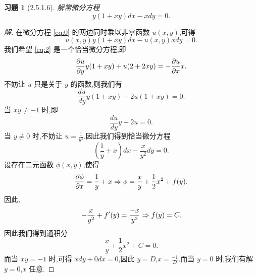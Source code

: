 \documentclass[a4paper, 12pt]{article} %
\newtheorem*{cdtheorem}{习题}
\newenvironment{exercise}
{\bigskip\begin{mdframed}[backgroundcolor=gray!40,rightline=false,leftline=false,topline=false,bottomline=false]\begin{cdtheorem}}
    {\end{cdtheorem}\end{mdframed}\bigskip}
\begin{document}
\begin{exercise}[2.5.1.6]
解常微分方程
\begin{equation}
  \label{eq:0}
  y(1+xy)dx-xdy=0.
\end{equation}
\end{exercise}
\begin{proof}[解]
在微分方程 \eqref{eq:0} 的两边同时乘以非零函数 $u(x,y)$,可得
\begin{equation}
  \label{eq:2}
  u(x,y)y(1+xy)dx-u(x,y)xdy=0.
\end{equation}
我们希望 \eqref{eq:2} 是一个恰当微分方程,即
$$
\frac{\partial u}{\partial y}y(1+xy)+u(2+2xy)=-\frac{\partial u}{\partial x}x.
$$
不妨让 $u$ 只是关于 $y$ 的函数,则我们有
$$
\frac{du}{dy}y(1+xy)+2u(1+xy)=0.
$$
当 $xy\neq -1$ 时,即
$$
\frac{du}{dy}y+2u=0.
$$
当 $y\neq 0$ 时,不妨让 $u=\frac{1}{y^2}$.因此我们得到恰当微分方程
$$
(\frac{1}{y}+x)dx-\frac{x}{y^2}dy=0.
$$
设存在二元函数 $\phi(x,y)$,使得
$$
\frac{\partial\phi}{\partial x}=\frac{1}{y}+x\Rightarrow \phi=\frac{x}{y}+\frac{1}{2}x^2+f(y).
$$
因此,
$$
-\frac{x}{y^2}+f'(y)=\frac{-x}{y^2}\Rightarrow f(y)=C.
$$
因此我们得到通积分
$$
\frac{x}{y}+\frac{1}{2}x^2+C=0.
$$
而当 $xy=-1$ 时,可得 $xdy+0dx=0$,因此 $y=D$,$x=\frac{-1}{D}$.而当
$y=0$ 时,我们有解 $y=0$,$x$ 任意.
\begin{comment}
我们将微分方程分组,得到
$$
(ydx-xdy)+xydx=0.
$$
对于微分方程
\begin{equation}
  \label{eq:1}
  ydx-xdy=0
\end{equation}
来说,当 $y\neq 0$ 时,其积分因子为 $\frac{1}{y^2}$,将 \eqref{eq:1} 两边乘以积分因子,可
得恰当微分方程
\begin{equation}
  \label{eq:2}
  \frac{1}{y}dx-\frac{x}{y^{2}}dy=0.
l\end{equation}
设二元函数 $\phi(x,y)$ 满足
$$
\frac{\pa\phi}{\pa x}=\frac{1}{y}\ri \phi=\frac{x}{y}+f(y).
$$
因此
$$
-\frac{x}{y^2}+f'(y)=\frac{-x}{y^2}\ri f(y)=C.
$$
可见,通积分为
$$
\frac{x}{y}+C=0.
$$
易得 $\frac{1}{y^2}g(\frac{x}{y})$ 也是 \eqref{eq:1} 的积分因子,其中
$g$ 是可微函数.下面我们来看另一个微分方程
\begin{equation}
  \label{eq:3}
  xydx=0.
\end{equation}
易得积分因子为 $\frac{1}{y}$.将积分因子乘上 \eqref{eq:3} 的时候,我们就
得到
$$
xdx=0,
$$
因此通积分为 $\frac{1}{2}x^2+C=0$.易得 $\frac{1}{y}h(x^2)$ 也是
\eqref{eq:3} 的一个积分因子,其中 $h$ 是可微函数.我们希望
$$
\frac{1}{y^2}g(\frac{x}{y})=\frac{1}{y}h(x^2).
$$
即
$$
\frac{1}{y}g(\frac{x}{y})=h(x^2).
$$
当 $x\neq 0$ 时,令 
$$
g(\frac{x}{y})=\frac{y}{x},h(x^2)=\frac{1}{x}.
$$
因此可得微分方程 \eqref{eq:0} 的积分因子为 $\frac{1}{xy}$.将积分因子乘
以方程 \eqref{eq:0} 的两侧,得到
\begin{equation}
  \label{eq:5}
  (\frac{1}{x}+y)dx-\frac{1}{y}dy=0.
\end{equation}
设存在二元函数 $\Phi(x,y)$,使得
$$
\frac{\pa\Phi}{\pa x}=\frac{1}{x}+y\ri \Phi=\ln|x| +xy+r(y).
$$
因此
$$
x+r'(y)
$$
\end{comment}








\end{proof}
\end{document}
